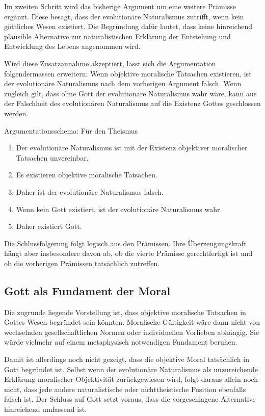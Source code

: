 \documentclass[a4paper,11pt]{article}
\begin{document}
	Im zweiten Schritt wird das bisherige Argument um eine weitere
	Prämisse ergänzt. Diese besagt, dass der evolutionäre Naturalismus
	zutrifft, wenn kein göttliches Wesen existiert. Die Begründung
	dafür lautet, dass keine hinreichend plausible Alternative zur
	naturalistischen Erklärung der Entstehung und Entwicklung des
	Lebens angenommen wird.
	
	Wird diese Zusatzannahme akzeptiert, lässt sich die Argumentation
	folgendermassen erweitern: Wenn objektive moralische Tatsachen
	existieren, ist der evolutionäre Naturalismus nach dem vorherigen
	Argument falsch. Wenn zugleich gilt, dass ohne Gott der
	evolutionäre Naturalismus wahr wäre, kann aus der Falschheit
	des evolutionären Naturalismus auf die Existenz Gottes
	geschlossen werden.
	
	\begin{mathbox}{Argumentationsschema: Für den Theismus}
		\begin{enumerate}[label=(\arabic*)]
			\item Der evolutionäre Naturalismus ist mit der Existenz
			objektiver moralischer Tatsachen unvereinbar.
			\item Es existieren objektive moralische Tatsachen.
			\item Daher ist der evolutionäre Naturalismus falsch.
			\item Wenn kein Gott existiert, ist der evolutionäre
			Naturalismus wahr.
			\item Daher existiert Gott.
		\end{enumerate}
		
		Die Schlussfolgerung folgt logisch aus den Prämissen. Ihre
		Überzeugungskraft hängt aber insbesondere davon ab, ob die
		vierte Prämisse gerechtfertigt ist und ob die vorherigen
		Prämissen tatsächlich zutreffen.
	\end{mathbox}
	
	\subsection{Gott als Fundament der Moral}
	
	Die zugrunde liegende Vorstellung ist, dass objektive moralische
	Tatsachen in Gottes Wesen begründet sein könnten. Moralische
	Gültigkeit wäre dann nicht von wechselnden gesellschaftlichen
	Normen oder individuellen Vorlieben abhängig. Sie würde vielmehr
	auf einem metaphysisch notwendigen Fundament beruhen.
	
	Damit ist allerdings noch nicht gezeigt, dass die objektive Moral
	tatsächlich in Gott begründet ist. Selbst wenn der evolutionäre
	Naturalismus als unzureichende Erklärung moralischer Objektivität
	zurückgewiesen wird, folgt daraus allein noch nicht, dass jede
	andere naturalistische oder nichttheistische Position ebenfalls
	falsch ist. Der Schluss auf Gott setzt voraus, dass die
	vorgeschlagene Alternative hinreichend umfassend ist.
	
\end{document}
